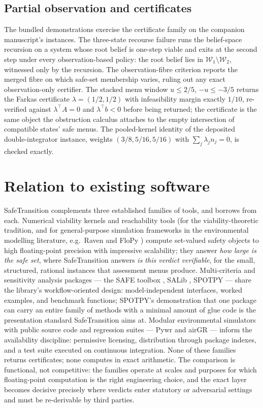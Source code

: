 \documentclass[3p,11pt]{elsarticle}
\begin{document}
\subsection{Partial observation and certificates}\label{sec:partial}

The bundled demonstrations exercise the certificate family on the companion
manuscript's instances. The three-state recourse failure runs the
belief-space recursion on a system whose root belief is one-step viable and
exits at the second step under every observation-based policy: the root
belief lies in $\mathcal{W}_1 \setminus \mathcal{W}_2$, witnessed only by
the recursion. The observation-fibre criterion reports the merged fibre on
which safe-set membership varies, ruling out any exact observation-only
certifier. The stacked menu window $u \leq 2/5$, $-u \leq -3/5$ returns the
Farkas certificate $\lambda = (1/2, 1/2)$ with infeasibility margin exactly
$1/10$, re-verified against $\lambda^{\top} A = 0$ and
$\lambda^{\top} b < 0$ before being returned; the certificate is the same
object the obstruction calculus attaches to the empty intersection of
compatible states' safe menus. The pooled-kernel identity of the deposited
double-integrator instance, weights $(3/8, 5/16, 5/16)$ with
$\sum_j \lambda_j n_j = 0$, is checked exactly.

\section{Relation to existing software}\label{sec:related}

SafeTransition complements three established families of tools, and borrows
from each. Numerical viability kernels and reachability tools (for the
viability-theoretic tradition, and for general-purpose simulation frameworks
in the environmental modelling literature, e.g.\ Raven
\citep{Craig2020} and FloPy \citep{Bakker2016}) compute set-valued safety
objects to high floating-point precision with impressive scalability; they
answer \emph{how large is the safe set}, where SafeTransition answers
\emph{is this verdict verifiable}, for the small, structured, rational
instances that assessment menus produce. Multi-criteria and sensitivity
analysis packages --- the SAFE toolbox \citep{Pianosi2015}, SALib
\citep{Herman2017}, SPOTPY \citep{Houska2015} --- share the library's
workflow-oriented design: model-independent interfaces, worked examples,
and benchmark functions; SPOTPY's demonstration that one package can carry
an entire family of methods with a minimal amount of glue code is the
presentation standard SafeTransition aims at. Modular environmental
simulators with public source code and regression suites --- Pywr
\citep{Tomlinson2020} and airGR \citep{Coron2017} --- inform the
availability discipline: permissive licensing, distribution through package
indexes, and a test suite executed on continuous integration. None of these
families returns certificates; none computes in exact arithmetic. The
comparison is functional, not competitive: the families operate at scales
and purposes for which floating-point computation is the right engineering
choice, and the exact layer becomes decisive precisely where verdicts enter
statutory or adversarial settings and must be re-derivable by third parties.
\end{document}
